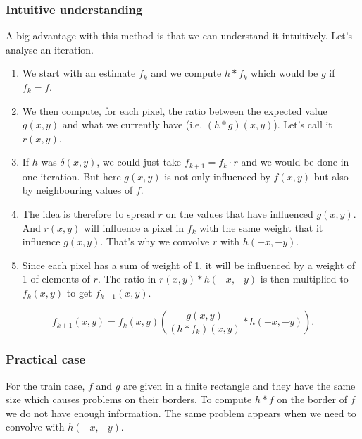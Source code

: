 \subsubsection{Intuitive understanding}
A big advantage with this method is that we can understand
it intuitively.
Let's analyse an iteration.
\begin{enumerate}
  \item We start with an estimate $f_k$ and we compute
    $h * f_k$ which would be $g$ if $f_k = f$.
  \item We then compute, for each pixel, the ratio between
    the expected value $g(x,y)$ and what we currently have
    (i.e.  $(h * g)(x,y)$).
    Let's call it $r(x,y)$.
  \item If $h$ was $\delta(x,y)$, we could just take
    $f_{k+1} = f_k \cdot r$ and we would be done in one
    iteration.
    But here $g(x,y)$ is not only influenced by
    $f(x,y)$ but also by neighbouring values of $f$.
  \item The idea is therefore to spread $r$ on the values
    that have influenced $g(x,y)$.
    And $r(x,y)$ will influence a pixel in $f_k$ with the same
    weight that it influence $g(x,y)$.
    That's why we convolve $r$ with $h(-x,-y)$.
  \item Since each pixel has a sum of weight of 1,
    it will be influenced by a weight of 1 of elements of $r$.
    The ratio in $r(x,y) * h(-x, -y)$ is then multiplied to
    $f_k(x,y)$ to get $f_{k+1}(x,y)$.
\end{enumerate}
\[ f_{k+1}(x,y) = f_k(x,y)\left(\frac{g(x,y)}{(h*f_k)(x,y)} * h(-x,-y)\right). \]

\subsubsection{Practical case}
For the train case, $f$ and $g$ are given in a finite rectangle
and they have the same size which causes problems on their borders.
To compute $h * f$ on the border of $f$ we do not have enough
information. The same problem appears when we need to
convolve with $h(-x,-y)$.

